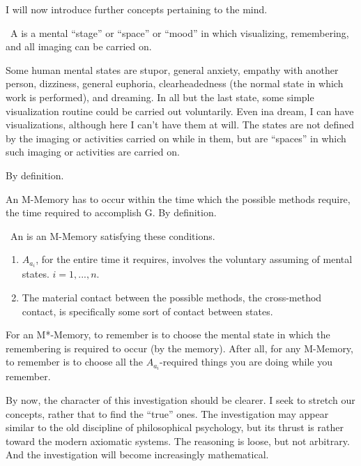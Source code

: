 I will now introduce further concepts pertaining to the mind. 

\begin{hangers}
\ A  is a mental \enquote{stage} or \enquote{space} or \enquote{mood} 
in which visualizing, remembering, and all imaging can be carried on. 
\end{hangers}

Some human mental states are stupor, general anxiety, empathy with 
another person, dizziness, general euphoria, clearheadedness (the normal 
state in which work is performed), and dreaming. In all but the last state, 
some simple visualization routine could be carried out voluntarily. Even ina 
dream, I can have visualizations, although here I can't have them at will. The 
states are not defined by the imaging or activities carried on while in them, 
but are \enquote{spaces} in which such imaging or activities are carried on. 

By definition. 

\begin{hangers}
 An M-Memory has to occur within the time which the 
possible methods require, the time required to accomplish G. By definition. 

\ An  is an M-Memory satisfying these 
conditions. \label{mstardef}
\begin{enumerate}
\item $A_{a_i}$, for the entire time it requires, involves the voluntary 
assuming of mental states. $i=1,...,n$.
\item The material contact between the 
possible methods, the cross-method contact, is specifically some sort of 
contact between states. 
\end{enumerate}

 For an M*-Memory, to remember is to choose the 
mental state in which the remembering is required to occur (by the 
memory). After all, for any M-Memory, to remember is to choose all the 
$A_{a_i}$-required things you are doing while you remember. 
\end{hangers}

By now, the character of this investigation should be clearer. I seek to 
stretch our concepts, rather that to find the \enquote{true} ones. The investigation 
may appear similar to the old discipline of philosophical psychology, but its 
thrust is rather toward the modern axiomatic systems. The reasoning is 
loose, but not arbitrary. And the investigation will become increasingly 
mathematical. 


